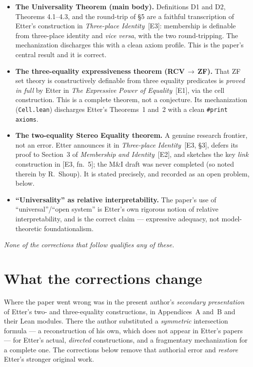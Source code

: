 \documentclass[11pt]{article}
\begin{document}
\begin{itemize}
\item \textbf{The Universality Theorem (main body).} Definitions D1 and D2, Theorems
4.1--4.3, and the round-trip of \S5 are a faithful transcription of Etter's construction in
\emph{Three-place Identity}~[E3]: membership is definable from three-place identity and
\emph{vice versa}, with the two round-tripping. The mechanization discharges this with a
clean axiom profile. This is the paper's central result and it is correct.

\item \textbf{The three-equality expressiveness theorem (RCV\,$\to$\,ZF).} That ZF set theory
is constructively definable from three equality predicates is \emph{proved in full} by Etter
in \emph{The Expressive Power of Equality}~[E1], via the cell construction. This is a
complete theorem, not a conjecture. Its mechanization (\texttt{Cell.lean}) discharges Etter's
Theorems~1 and~2 with a clean \texttt{\#print axioms}.

\item \textbf{The two-equality Stereo Equality theorem.} A genuine research frontier, not an
error. Etter announces it in \emph{Three-place Identity}~[E3, \S3], defers its proof to
Section~3 of \emph{Membership and Identity}~[E2], and sketches the key \emph{link}
construction in [E3, fn.~5]; the M\&I draft was never completed (so noted therein by
R.~Shoup). It is stated precisely, and recorded as an open problem, below.

\item \textbf{``Universality'' as relative interpretability.} The paper's use of
``universal''/``open system'' is Etter's own rigorous notion of relative interpretability,
and is the correct claim --- expressive adequacy, not model-theoretic foundationalism.
\end{itemize}

\emph{None of the corrections that follow qualifies any of these.}

\section{What the corrections change}

Where the paper went wrong was in the present author's \emph{secondary presentation} of
Etter's two- and three-equality constructions, in Appendices~A and~B and their Lean modules.
There the author substituted a \emph{symmetric} intersection formula --- a reconstruction of
his own, which does not appear in Etter's papers --- for Etter's actual, \emph{directed}
constructions, and a fragmentary mechanization for a complete one. The corrections below
remove that authorial error and \emph{restore} Etter's stronger original work.
\end{document}
